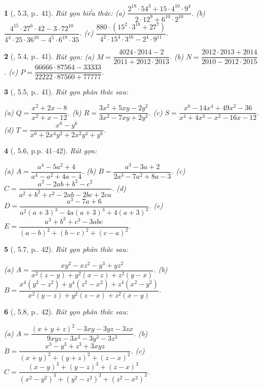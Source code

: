 \documentclass{article}
\newtheorem{baitoan}{}
\begin{document}
\begin{baitoan}[\cite{TLCT_THCS_Toan_8_dai_so}, 5.3, p.. 41]
	Rút gọn biểu thức: (a) $\dfrac{2^{18}\cdot 54^3 + 15\cdot 4^{10}\cdot 9^4}{2\cdot 12^9 + 6^{10}\cdot 2^{10}}$. (b) $\dfrac{4^{15}\cdot 27^6\cdot 42 - 3\cdot 72^{10}}{4^4\cdot 25\cdot 36^{10}  - 4^5\cdot 6^{19}\cdot 35}$. (c) $\dfrac{880\cdot(15^2\cdot 3^{18} + 27^7)}{4^2\cdot 15^4\cdot 3^{16} - 2^4\cdot 9^{11}}$.
\end{baitoan}

\begin{baitoan}[\cite{TLCT_THCS_Toan_8_dai_so}, 5.4, p.. 41]
	Rút gọn: (a) $M = \dfrac{4024\cdot 2014 - 2}{2011 + 2012\cdot 2013}$. (b) $N = \dfrac{2012\cdot 2013 + 2014}{2010 - 2012\cdot 2015}$. (c) $P = \dfrac{66666\cdot 87564 - 33333}{22222\cdot 87560 + 77777}$.
\end{baitoan}

\begin{baitoan}[\cite{TLCT_THCS_Toan_8_dai_so}, 5.5, p.. 41]
	Rút gọn phân thức sau:
	
		(a) $Q = \dfrac{x^2 + 2x - 8}{x^2 + x - 12}$.
		(b) $R = \dfrac{3x^2 + 5xy - 2y^2}{3x^2 - 7xy + 2y^2}$.
		(c) $S = \dfrac{x^6 - 14x^4 + 49x^2 - 36}{x^4 + 4x^3 - x^2 - 16x - 12}$.
		(d) $T = \dfrac{x^6 - y^6}{x^6 + 2x^4y^2 + 2x^2y^4 + y^6}$.
	
\end{baitoan}

\begin{baitoan}[\cite{TLCT_THCS_Toan_8_dai_so}, 5.6, p.p. 41--42]
	Rút gọn:
	
		(a) $A = \dfrac{a^4 - 5a^2 + 4}{a^4 - a^2 + 4a - 4}$.
		(b) $B = \dfrac{a^3 - 3a + 2}{2a^3 - 7a^2 + 8a - 3}$.
		(c) $C = \dfrac{a^2 - 2ab + b^2 - c^2}{a^2 + b^2 + c^2 - 2ab - 2bc + 2ca}$.
		(d) $D = \dfrac{a^3 - 7a + 6}{a^2(a + 3)^3 - 4a(a + 3)^3 + 4(a + 3)^3}$.
		(e) $E = \dfrac{a^3 + b^3 + c^3 - 3abc}{(a - b)^2 + (b - c)^2 + (c - a)^2}$.
	
\end{baitoan}

\begin{baitoan}[\cite{TLCT_THCS_Toan_8_dai_so}, 5.7, p.. 42]
	Rút gọn phân thức sau:
	
		(a) $A = \dfrac{xy^2 - xz^2 - y^3 + yz^2}{x^2(z - y) + y^2(x - z) + z^2(y - x)}$.
		(b) $B = \dfrac{x^4(y^2 - z^2) + y^4(z^2 - x^2) + z^4(x^2 - y^2)}{x^2(y - z) + y^2(z - x) + z^2(x - y)}$.
	
\end{baitoan}

\begin{baitoan}[\cite{TLCT_THCS_Toan_8_dai_so}, 5.8, p.. 42]
	Rút gọn phân thức sau:
	
		(a) $A = \dfrac{(x + y + z)^2 - 3xy - 3yz - 3zx}{9xyz - 3x^3 - 3y^3 - 3z^3}$.
		(b) $B = \dfrac{x^3 - y^3 + z^3 + 3xyz}{(x + y)^2 + (y + z)^2 + (z - x)^2}$.
		(c) $C = \dfrac{(x - y)^3 + (y - z)^3 + (z - x)^3}{(x^2 - y^2)^3 + (y^2 - z^2)^3 + (z^2 - x^2)^3}$.
	
\end{baitoan}
\end{document}
